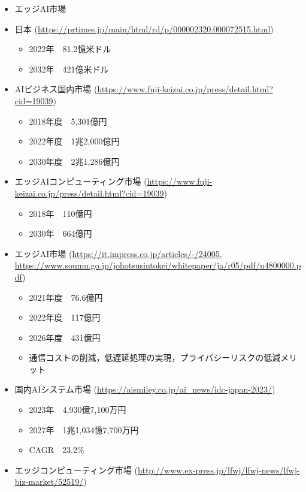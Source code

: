 \begin{itemize}
	\begin{itemize}
		\item エッジAI市場
			\item 日本 (\url{https://prtimes.jp/main/html/rd/p/000002320.000072515.html})
			\begin{itemize}
				\item 2022年　81.2憶米ドル
				\item 2032年　421億米ドル
			\end{itemize}
			\item AIビジネス国内市場 (\url{https://www.fuji-keizai.co.jp/press/detail.html?cid=19039})
			\begin{itemize}
				\item 2018年度　5,301億円
				\item 2022年度　1兆2,000億円
				\item 2030年度　2兆1,286億円
			\end{itemize}
			\item エッジAIコンピューティング市場 (\url{https://www.fuji-keizai.co.jp/press/detail.html?cid=19039})
			\begin{itemize}
				\item 2018年　110億円
				\item 2030年　664億円
			\end{itemize}
			\item エッジAI市場 (\url{https://it.impress.co.jp/articles/-/24005}, \url{https://www.soumu.go.jp/johotsusintokei/whitepaper/ja/r05/pdf/n4800000.pdf})
			\begin{itemize}
				\item 2021年度　76.6億円
				\item 2022年度　117億円
				\item 2026年度　431億円
				\item 通信コストの削減，低遅延処理の実現，プライバシーリスクの低減メリット
			\end{itemize}
			\item 国内AIシステム市場 (\url{https://aismiley.co.jp/ai_news/idc-japan-2023/})
			\begin{itemize}
				\item 2023年　4,930億7,100万円
				\item 2027年　1兆1,034憶7,700万円
				\item CAGR　23.2\%
			\end{itemize}
		\item エッジコンピューティング市場 (\url{http://www.ex-press.jp/lfwj/lfwj-news/lfwj-biz-market/52519/})
		\begin{itemize}

\end{itemize}
\end{itemize}
\end{itemize}
